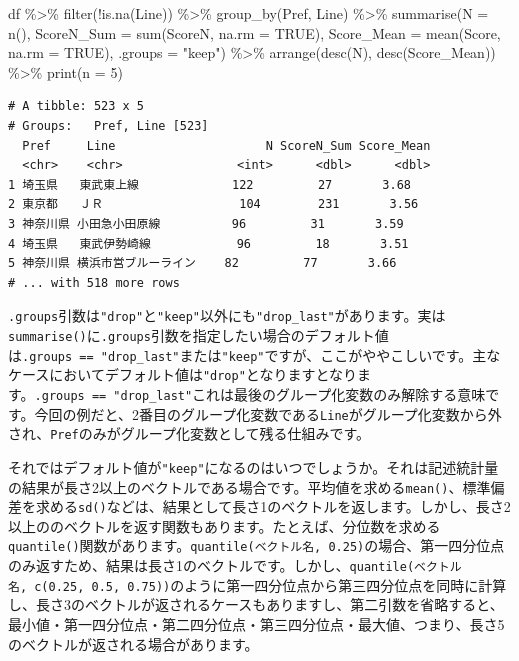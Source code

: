 \documentclass[
  a4paper,
  pandoc,
  ja=standard,
  jafont=haranoaji]{bxjsbook}
\newenvironment{Shaded}{\begin{snugshade}}{\end{snugshade}}
\newcommand{\AttributeTok}[1]{\textcolor[rgb]{0.00,0.48,0.65}{#1}}
\newcommand{\ConstantTok}[1]{\textcolor[rgb]{0.56,0.35,0.01}{#1}}
\newcommand{\DecValTok}[1]{\textcolor[rgb]{0.68,0.00,0.00}{#1}}
\newcommand{\FunctionTok}[1]{\textcolor[rgb]{0.28,0.35,0.67}{#1}}
\newcommand{\NormalTok}[1]{\textcolor[rgb]{0.00,0.48,0.65}{#1}}
\newcommand{\SpecialCharTok}[1]{\textcolor[rgb]{0.37,0.37,0.37}{#1}}
\newcommand{\StringTok}[1]{\textcolor[rgb]{0.13,0.47,0.30}{#1}}
\begin{document}
\begin{Shaded}
\begin{Highlighting}[numbers=left,,]
\NormalTok{df }\SpecialCharTok{\%\textgreater{}\%}
  \FunctionTok{filter}\NormalTok{(}\SpecialCharTok{!}\FunctionTok{is.na}\NormalTok{(Line)) }\SpecialCharTok{\%\textgreater{}\%} 
  \FunctionTok{group\_by}\NormalTok{(Pref, Line) }\SpecialCharTok{\%\textgreater{}\%} 
  \FunctionTok{summarise}\NormalTok{(}\AttributeTok{N           =} \FunctionTok{n}\NormalTok{(),}
            \AttributeTok{ScoreN\_Sum  =} \FunctionTok{sum}\NormalTok{(ScoreN,  }\AttributeTok{na.rm =} \ConstantTok{TRUE}\NormalTok{),}
            \AttributeTok{Score\_Mean  =} \FunctionTok{mean}\NormalTok{(Score,  }\AttributeTok{na.rm =} \ConstantTok{TRUE}\NormalTok{),}
            \AttributeTok{.groups     =} \StringTok{"keep"}\NormalTok{) }\SpecialCharTok{\%\textgreater{}\%}
  \FunctionTok{arrange}\NormalTok{(}\FunctionTok{desc}\NormalTok{(N), }\FunctionTok{desc}\NormalTok{(Score\_Mean)) }\SpecialCharTok{\%\textgreater{}\%}
  \FunctionTok{print}\NormalTok{(}\AttributeTok{n =} \DecValTok{5}\NormalTok{)}
\end{Highlighting}
\end{Shaded}

\begin{verbatim}
# A tibble: 523 x 5
# Groups:   Pref, Line [523]
  Pref     Line                     N ScoreN_Sum Score_Mean
  <chr>    <chr>                <int>      <dbl>      <dbl>
1 埼玉県   東武東上線             122         27       3.68
2 東京都   ＪＲ                   104        231       3.56
3 神奈川県 小田急小田原線          96         31       3.59
4 埼玉県   東武伊勢崎線            96         18       3.51
5 神奈川県 横浜市営ブルーライン    82         77       3.66
# ... with 518 more rows
\end{verbatim}

\texttt{.groups}引数は\texttt{"drop"}と\texttt{"keep"}以外にも\texttt{"drop\_last"}があります。実は\texttt{summarise()}に\texttt{.groups}引数を指定したい場合のデフォルト値は\texttt{.groups\ ==\ "drop\_last"}または\texttt{"keep"}ですが、ここがややこしいです。主なケースにおいてデフォルト値は\texttt{"drop"}となりますとなります。\texttt{.groups\ ==\ "drop\_last"}これは最後のグループ化変数のみ解除する意味です。今回の例だと、2番目のグループ化変数である\texttt{Line}がグループ化変数から外され、\texttt{Pref}のみがグループ化変数として残る仕組みです。

それではデフォルト値が\texttt{"keep"}になるのはいつでしょうか。それは記述統計量の結果が長さ2以上のベクトルである場合です。平均値を求める\texttt{mean()}、標準偏差を求める\texttt{sd()}などは、結果として長さ1のベクトルを返します。しかし、長さ2以上ののベクトルを返す関数もあります。たとえば、分位数を求める\texttt{quantile()}関数があります。\texttt{quantile(ベクトル名,\ 0.25)}の場合、第一四分位点のみ返すため、結果は長さ1のベクトルです。しかし、\texttt{quantile(ベクトル名,\ c(0.25,\ 0.5,\ 0.75))}のように第一四分位点から第三四分位点を同時に計算し、長さ3のベクトルが返されるケースもありますし、第二引数を省略すると、最小値・第一四分位点・第二四分位点・第三四分位点・最大値、つまり、長さ5のベクトルが返される場合があります。
\end{document}
